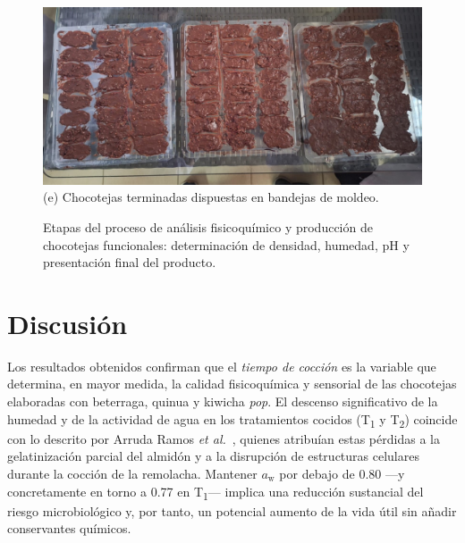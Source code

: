 \documentclass[manuscript,screen,review]{acmart}
\begin{document}
\begin{figure}[H]
  \vspace{1ex}
  \begin{minipage}{0.2\linewidth}
    \centering
    \includegraphics[width=\linewidth]{imagen/resultado 1.jpeg}
    \vspace{1mm}
    \small (e) Chocotejas terminadas dispuestas en bandejas de moldeo.
  \end{minipage}

  \caption{Etapas del proceso de análisis fisicoquímico y producción de chocotejas funcionales: determinación de densidad, humedad, pH y presentación final del producto.}
  \label{fig:proceso_analisis}
\end{figure}





\section{Discusión}

Los resultados obtenidos confirman que el \emph{tiempo de cocción} es la variable que determina, en mayor medida, la calidad fisicoquímica y sensorial de las chocotejas elaboradas con beterraga, quinua y kiwicha \textit{pop}. El descenso significativo de la humedad y de la actividad de agua en los tratamientos cocidos (T\textsubscript{1} y T\textsubscript{2}) coincide con lo descrito por Arruda Ramos \textit{et al.}~\cite{ArrudaRamos2017}, quienes atribuían estas pérdidas a la gelatinización parcial del almidón y a la disrupción de estructuras celulares durante la cocción de la remolacha. Mantener $a_\mathrm{w}$ por debajo de 0.80 —y concretamente en torno a 0.77 en T\textsubscript{1}— implica una reducción sustancial del riesgo microbiológico y, por tanto, un potencial aumento de la vida útil sin añadir conservantes químicos.
\end{document}
